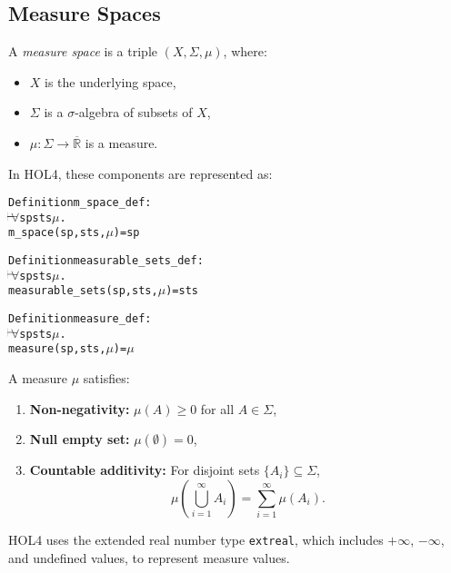 \subsection{Measure Spaces}

A \emph{measure space} is a triple $ (X, \Sigma, \mu) $, where:
\begin{itemize}
  \item $ X $ is the underlying space,
  \item $ \Sigma $ is a $ \sigma $-algebra of subsets of $ X $,
  \item $ \mu : \Sigma \to \overline{\mathbb{R}} $ is a measure.
\end{itemize}

In HOL4, these components are represented as:
\begin{hol}
  \begin{alltt}
    Definition m\_space\_def :
    \(\!\!\!{\turn}\!\!\!\!\) \(\forall\)sp sts \(\mu\).
    m\_space (sp, sts, \(\mu\)) = sp
  \end{alltt}
\end{hol}

\begin{hol}
  \begin{alltt}
    Definition measurable\_sets\_def :
    \(\!\!\!{\turn}\!\!\!\!\) \(\forall\)sp sts \(\mu\).
    measurable\_sets (sp, sts, \(\mu\)) = sts
  \end{alltt}
\end{hol}

\begin{hol}
  \begin{alltt}
    Definition measure\_def :
    \(\!\!\!{\turn}\!\!\!\!\) \(\forall\)sp sts \(\mu\).
    measure (sp, sts, \(\mu\)) = \(\mu\)
  \end{alltt}
\end{hol}


A measure $ \mu $ satisfies:
\begin{enumerate}
  \item \textbf{Non-negativity:} $ \mu(A) \geq 0 $ for all $ A \in \Sigma $,
  \item \textbf{Null empty set:} $ \mu(\emptyset) = 0 $,
  \item \textbf{Countable additivity:} For disjoint sets $ \{A_i\} \subseteq \Sigma $,
  \[
    \mu\left(\bigcup_{i=1}^\infty A_i\right) = \sum_{i=1}^\infty \mu(A_i).
  \]
\end{enumerate}

HOL4 uses the extended real number type \texttt{extreal}, which includes $ +\infty $, $ -\infty $, and undefined values, to represent measure values.

